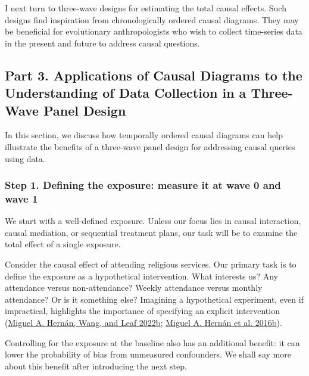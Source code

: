 \documentclass[
  singlecolumn]{article}
\begin{document}
I next turn to three-wave designs for estimating the total causal
effects. Such designs find inspiration from chronologically ordered
causal diagrams. They may be beneficial for evolutionary anthropologists
who wish to collect time-series data in the present and future to
address causal questions.

\hypertarget{part-3.-applications-of-causal-diagrams-to-the-understanding-of-data-collection-in-a-three-wave-panel-design}{%
\subsection{Part 3. Applications of Causal Diagrams to the Understanding
of Data Collection in a Three-Wave Panel
Design}\label{part-3.-applications-of-causal-diagrams-to-the-understanding-of-data-collection-in-a-three-wave-panel-design}}

In this section, we discuss how temporally ordered causal diagrams can
help illustrate the benefits of a three-wave panel design for addressing
causal queries using data.

\hypertarget{step-1.-defining-the-exposure-measure-it-at-wave-0-and-wave-1}{%
\subsubsection{Step 1. Defining the exposure: measure it at wave 0 and
wave
1}\label{step-1.-defining-the-exposure-measure-it-at-wave-0-and-wave-1}}

We start with a well-defined exposure. Unless our focus lies in causal
interaction, causal mediation, or sequential treatment plans, our task
will be to examine the total effect of a single exposure.

Consider the causal effect of attending religious services. Our primary
task is to define the exposure as a hypothetical intervention. What
interests us? Any attendance versus non-attendance? Weekly attendance
versus monthly attendance? Or is it something else? Imagining a
hypothetical experiment, even if impractical, highlights the importance
of specifying an explicit intervention
(\protect\hyperlink{ref-hernuxe1n2022}{Miguel A. Hernán, Wang, and Leaf
2022b}; \protect\hyperlink{ref-hernuxe1n2016a}{Miguel A. Hernán et al.
2016b}).

Controlling for the exposure at the baseline also has an additional
benefit: it can lower the probability of bias from unmeasured
confounders. We shall say more about this benefit after introducing the
next step.
\end{document}

